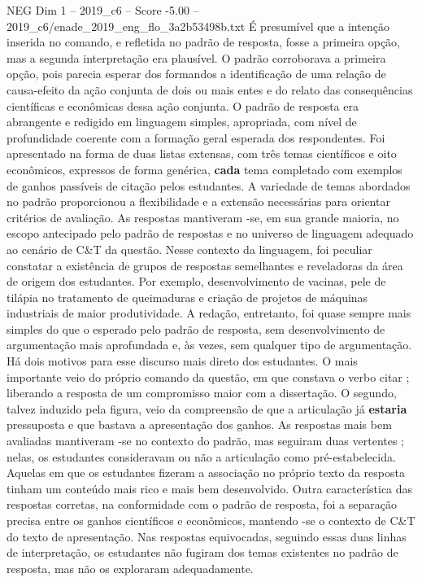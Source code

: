 \begin{textsample}{NEG Dim 1 – 2019\_c6 – Score -5.00 – 2019\_c6/enade\_2019\_eng\_flo\_3a2b53498b.txt}
É presumível que a intenção inserida no comando, e refletida no padrão de resposta, fosse a primeira opção, mas a segunda interpretação era plausível.
O padrão corroborava a primeira opção, pois parecia esperar dos formandos a identificação de uma relação de causa-efeito da ação conjunta de dois ou mais entes e do relato das consequências científicas e econômicas dessa ação conjunta.
O padrão de resposta era abrangente e redigido em linguagem simples, apropriada, com nível de profundidade coerente com a formação geral esperada dos respondentes.
Foi apresentado na forma de duas listas extensas, com três temas científicos e oito econômicos, expressos de forma genérica, \textbf{cada} tema completado com exemplos de ganhos passíveis de citação pelos estudantes.
A variedade de temas abordados no padrão proporcionou a flexibilidade e a extensão necessárias para orientar critérios de avaliação.
As respostas mantiveram -se, em sua grande maioria, no escopo antecipado pelo padrão de respostas e no universo de linguagem adequado ao cenário de C\&T da questão.
Nesse contexto da linguagem, foi peculiar constatar a existência de grupos de respostas semelhantes e reveladoras da área de origem dos estudantes.
Por exemplo, desenvolvimento de vacinas, pele de tilápia no tratamento de queimaduras e criação de projetos de máquinas industriais de maior produtividade.
A redação, entretanto, foi quase sempre mais simples do que o esperado pelo padrão de resposta, sem desenvolvimento de argumentação mais aprofundada e, às vezes, sem qualquer tipo de argumentação.
Há dois motivos para esse discurso mais direto dos estudantes.
O mais importante veio do próprio comando da questão, em que constava o verbo citar ; liberando a resposta de um compromisso maior com a dissertação.
O segundo, talvez induzido pela figura, veio da compreensão de que a articulação já \textbf{estaria} pressuposta e que bastava a apresentação dos ganhos.
As respostas mais bem avaliadas mantiveram -se no contexto do padrão, mas seguiram duas vertentes ; nelas, os estudantes consideravam ou não a articulação como pré-estabelecida.
Aquelas em que os estudantes fizeram a associação no próprio texto da resposta tinham um conteúdo mais rico e mais bem desenvolvido.
Outra característica das respostas corretas, na conformidade com o padrão de resposta, foi a separação precisa entre os ganhos científicos e econômicos, mantendo -se o contexto de C\&T do texto de apresentação.
Nas respostas equivocadas, seguindo essas duas linhas de interpretação, os estudantes não fugiram dos temas existentes no padrão de resposta, mas não os exploraram adequadamente.

\end{textsample}
